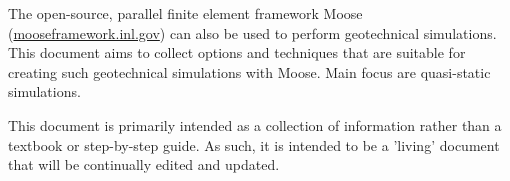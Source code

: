 The open-source, parallel finite element framework Moose
(\url{mooseframework.inl.gov}) can also be used to perform geotechnical
simulations. This document aims to collect options and techniques that are
suitable for creating such geotechnical simulations with Moose. Main focus are
quasi-static simulations.

This document is primarily intended as a collection of information rather than
a textbook or step-by-step guide. As such, it is intended to be a 'living'
document that will be continually edited and updated.
